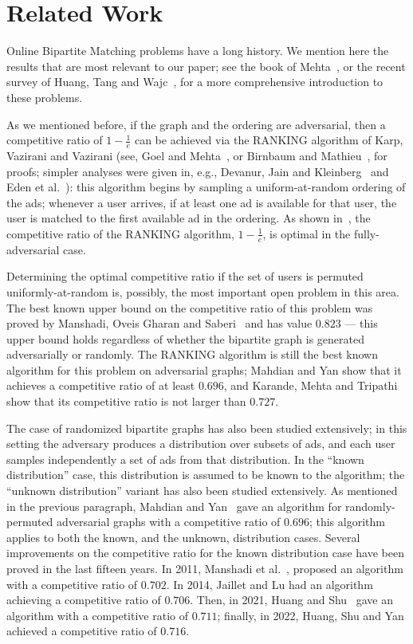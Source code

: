 \documentclass[11pt]{article}
\begin{document}
\section{Related Work}\label{sec:relatedwork}

Online Bipartite Matching problems have a long history. We mention here the results that are most relevant to our paper; see the book of Mehta~\cite{mehta13}, or the recent survey of Huang, Tang and Wajc~\cite{htw24}, for a more comprehensive introduction to these problems. 

As we mentioned before, if the graph and the ordering are adversarial, then a competitive ratio of $1 - \frac1e$ can be achieved via the RANKING algorithm of Karp, Vazirani and Vazirani \cite{kvv90} (see, Goel and Mehta~\cite{gm08}, or Birnbaum and Mathieu~\cite{bm08}, for proofs; simpler analyses were given in, e.g., Devanur, Jain and Kleinberg~\cite{djk13} and Eden et al.~\cite{effs21}): this algorithm begins by sampling a uniform-at-random ordering of the ads; whenever a user arrives, if at least one ad is available for that user, the user is matched to the first available ad in the ordering. As shown in~\cite{kvv90}, the competitive ratio of the RANKING algorithm, $1- \frac1e$, is optimal in the fully-adversarial case.

\smallskip

Determining the optimal competitive ratio if the set of users is permuted uniformly-at-random is, possibly, the most important open problem in this area.
The best known upper bound on the competitive ratio of this problem was proved by Manshadi, Oveis Gharan and Saberi~\cite{mos11,mos12} and has value $0.823$ --- this upper bound holds regardless of whether the bipartite graph is generated adversarially or randomly. The RANKING algorithm is still the best known algorithm  for this  problem  on adversarial graphs; Mahdian and Yan\cite{my11} show that it achieves a competitive ratio of at least $0.696$, and Karande, Mehta and Tripathi~\cite{kmt11} show that its competitive ratio is not larger than $0.727$.

\smallskip

The case of randomized bipartite graphs has also been studied extensively;
in this setting the adversary produces a distribution over subsets of ads, and each user samples independently a set of ads from that distribution. In the ``known distribution'' case, this distribution is assumed to be known to the algorithm; the ``unknown distribution'' variant has also been studied extensively. As  mentioned in the previous paragraph, Mahdian and Yan~\cite{my11} gave an algorithm for randomly-permuted adversarial graphs  with a competitive ratio of $0.696$; this algorithm applies to both the known, and the unknown, distribution cases.
Several improvements on the competitive ratio for the known distribution case  have been proved in the last fifteen years.
In 2011, Manshadi et al.~\cite{mos11},  proposed  an algorithm with a competitive ratio of $0.702$. In 2014, Jaillet and Lu\cite{jl14} had an algorithm achieving a competitive ratio of $0.706$.
Then, in 2021, Huang and Shu~\cite{hs21} gave an algorithm with a competitive ratio of $0.711$; finally,  in 2022, Huang, Shu and Yan\cite{hsy22} achieved a competitive ratio of $0.716$. 
\end{document}
